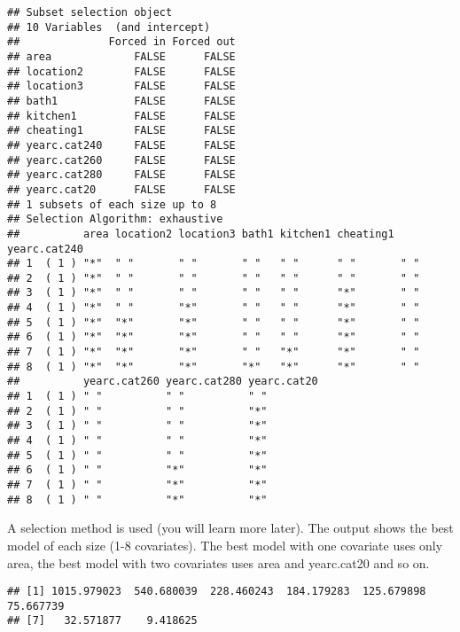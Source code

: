 \documentclass[]{article}
\newenvironment{Shaded}{\begin{snugshade}}{\end{snugshade}}
\newcommand{\KeywordTok}[1]{\textcolor[rgb]{0.13,0.29,0.53}{\textbf{#1}}}
\newcommand{\OperatorTok}[1]{\textcolor[rgb]{0.81,0.36,0.00}{\textbf{#1}}}
\newcommand{\NormalTok}[1]{#1}
\begin{document}
\begin{verbatim}
## Subset selection object
## 10 Variables  (and intercept)
##              Forced in Forced out
## area             FALSE      FALSE
## location2        FALSE      FALSE
## location3        FALSE      FALSE
## bath1            FALSE      FALSE
## kitchen1         FALSE      FALSE
## cheating1        FALSE      FALSE
## yearc.cat240     FALSE      FALSE
## yearc.cat260     FALSE      FALSE
## yearc.cat280     FALSE      FALSE
## yearc.cat20      FALSE      FALSE
## 1 subsets of each size up to 8
## Selection Algorithm: exhaustive
##          area location2 location3 bath1 kitchen1 cheating1 yearc.cat240
## 1  ( 1 ) "*"  " "       " "       " "   " "      " "       " "         
## 2  ( 1 ) "*"  " "       " "       " "   " "      " "       " "         
## 3  ( 1 ) "*"  " "       " "       " "   " "      "*"       " "         
## 4  ( 1 ) "*"  " "       "*"       " "   " "      "*"       " "         
## 5  ( 1 ) "*"  "*"       "*"       " "   " "      "*"       " "         
## 6  ( 1 ) "*"  "*"       "*"       " "   " "      "*"       " "         
## 7  ( 1 ) "*"  "*"       "*"       " "   "*"      "*"       " "         
## 8  ( 1 ) "*"  "*"       "*"       "*"   "*"      "*"       " "         
##          yearc.cat260 yearc.cat280 yearc.cat20
## 1  ( 1 ) " "          " "          " "        
## 2  ( 1 ) " "          " "          "*"        
## 3  ( 1 ) " "          " "          "*"        
## 4  ( 1 ) " "          " "          "*"        
## 5  ( 1 ) " "          " "          "*"        
## 6  ( 1 ) " "          "*"          "*"        
## 7  ( 1 ) " "          "*"          "*"        
## 8  ( 1 ) " "          "*"          "*"
\end{verbatim}

A selection method is used (you will learn more later). The output shows
the best model of each size (1-8 covariates). The best model with one
covariate uses only area, the best model with two covariates uses area
and yearc.cat20 and so on.

\begin{Shaded}
\end{Shaded}

\begin{verbatim}
## [1] 1015.979023  540.680039  228.460243  184.179283  125.679898   75.667739
## [7]   32.571877    9.418625
\end{verbatim}
\end{document}

